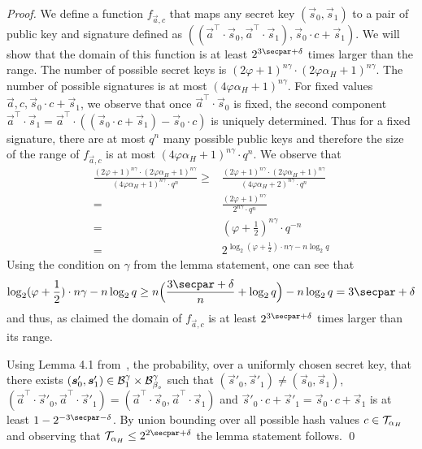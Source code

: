 \begin{proof}
  We define a function $f_{\vec{a}, c}$ that maps any secret key $(\vec{s}_0, \vec{s}_1)$ to a pair of public key and signature defined as $((\vec{a}^\intercal\cdot\vec{s}_0,\vec{a}^\intercal\cdot\vec{s}_1), \vec{s}_0\cdot c + \vec{s}_1)$.
  We will show that the domain of this function is at least $2^{3\secpar + \delta}$ times larger than the range.
  The number of possible secret keys is $(2\varphi+1)^{n\gamma} \cdot (2\varphi\alpha_H+1)^{n\gamma}$.
  The number of possible signatures is at most $(4\varphi\alpha_H + 1)^{n\gamma}$.
  For fixed values $\vec{a}, c, \vec{s}_0\cdot c + \vec{s}_1$, we observe that once $\vec{a}^\intercal\cdot\vec{s}_0$ is fixed, the second component $\vec{a}^\intercal\cdot\vec{s}_1 = \vec{a}^\intercal \cdot ((\vec{s}_0\cdot c + \vec{s}_1) - \vec{s}_0 \cdot c)$ is uniquely determined.
  Thus for a fixed signature, there are at most $q^n$ many possible public keys and therefore the size of the range of $f_{\vec{a}, c}$ is at most $(4 \varphi\alpha_H + 1)^{n\gamma} \cdot q^n$.
  We observe that
  \begin{align*}\frac{(2\varphi+1)^{n\gamma} \cdot (2\varphi\alpha_H+1)^{n\gamma}}{(4 \varphi\alpha_H + 1)^{n\gamma} \cdot q^n}
   \geq{}& \frac{(2\varphi+1)^{n\gamma} \cdot (2\varphi\alpha_H+1)^{n\gamma}}{(4 \varphi\alpha_H + 2)^{n\gamma} \cdot q^n}\\
   ={}& \frac{(2\varphi+1)^{n\gamma}}{2^{n\gamma} \cdot q^n}\\
   ={}& (\varphi+\frac{1}{2})^{n\gamma} \cdot q^{-n}\\
   ={}& 2^{\log_2(\varphi+\frac{1}{2})\cdot{n\gamma} - n \log_2 q}
  \end{align*}
  Using the condition on $\gamma$ from the lemma statement, one can see that
  \[
    \log_2(\varphi+\frac{1}{2})\cdot{n\gamma} - n \log_2 q
    \geq n\Bigl(\frac{3\secpar+\delta}{n}+\log_2q\Bigr) - n \log_2 q = 3\secpar+\delta
  \]
  and thus, as claimed the domain of $f_{\vec{a},c}$ is at least $2^{3\secpar + \delta}$ times larger than its range.
  
  Using Lemma 4.1 from~\cite{TCC:LyuMic08}, the probability, over a uniformly chosen secret key, that there exists $(\boldsymbol{s}'_0,\boldsymbol{s}'_1)\in \mathcal{B}_{1}^\gamma \times \mathcal{B}_{\beta_s}^\gamma$ such that $(\vec{s}'_0,\vec{s}'_1)\neq(\vec{s}_0,\vec{s}_1)$, $(\vec{a}^\intercal\cdot\vec{s}'_0,\vec{a}^\intercal\cdot\vec{s}'_1) = (\vec{a}^\intercal\cdot\vec{s}_0,\vec{a}^\intercal\cdot\vec{s}_1)$ and $\vec{s}'_0\cdot c + \vec{s}'_1 = \vec{s}_0\cdot c + \vec{s}_1$ is at least $1-2^{-3\secpar-\delta}$.
  By union bounding over all possible hash values $c \in \mathcal{T}_{\alpha_H}$ and observing that $\tern_{\alpha_H} \leq 2^{2\secpar + \delta}$ the lemma statement follows. \qed
\end{proof}

